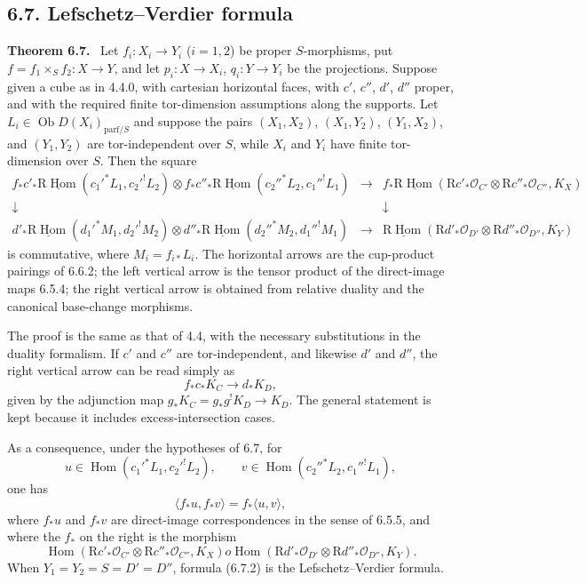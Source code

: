 \documentclass[12pt]{article}
\newcommand{\Hom}{\operatorname{Hom}}
\newcommand{\ob}{\operatorname{Ob}}
\newcommand{\R}{\mathrm R}
\newcommand{\cO}{\mathcal O}
\newenvironment{statement}[1]{\par\medskip\noindent\textbf{#1.}\ }{\par\medskip}
\begin{document}
\subsection*{6.7. Lefschetz--Verdier formula}
\begin{statement}{Theorem 6.7}
Let $f_i:X_i\to Y_i$ ($i=1,2$) be proper $S$-morphisms, put $f=f_1\times_S f_2:X\to Y$, and let $p_i:X\to X_i$, $q_i:Y\to Y_i$ be the projections. Suppose given a cube as in 4.4.0, with cartesian horizontal faces, with $c'$, $c''$, $d'$, $d''$ proper, and with the required finite tor-dimension assumptions along the supports. Let $L_i\in\ob D(X_i)_{\mathrm{parf}/S}$ and suppose the pairs $(X_1,X_2)$, $(X_1,Y_2)$, $(Y_1,X_2)$, and $(Y_1,Y_2)$ are tor-independent over $S$, while $X_i$ and $Y_i$ have finite tor-dimension over $S$. Then the square
\[
\begin{array}{ccc}
 f_*c'_*\underline{\R\Hom}(c_1'^*L_1,c_2'^!L_2)
 \otimes f_*c''_*\underline{\R\Hom}(c_2''^*L_2,c_1''^!L_1)
 &\to&
 f_*\underline{\R\Hom}(\R c'_*\cO_{C'}\otimes \R c''_*\cO_{C''},K_X)\\
 \downarrow && \downarrow\\
 d'_*\underline{\R\Hom}(d_1'^*M_1,d_2'^!M_2)
 \otimes d''_*\underline{\R\Hom}(d_2''^*M_2,d_1''^!M_1)
 &\to&
 \underline{\R\Hom}(\R d'_*\cO_{D'}\otimes \R d''_*\cO_{D''},K_Y)
\end{array}
\]
is commutative, where $M_i=f_{i*}L_i$. The horizontal arrows are the cup-product pairings of 6.6.2; the left vertical arrow is the tensor product of the direct-image maps 6.5.4; the right vertical arrow is obtained from relative duality and the canonical base-change morphisms.
\end{statement}

The proof is the same as that of 4.4, with the necessary substitutions in the duality formalism. If $c'$ and $c''$ are tor-independent, and likewise $d'$ and $d''$, the right vertical arrow can be read simply as
\[
   f_*c_*K_C\to d_*K_D,
\]
given by the adjunction map $g_*K_C=g_*g^!K_D\to K_D$. The general statement is kept because it includes excess-intersection cases.

As a consequence, under the hypotheses of 6.7, for
\[
   u\in\Hom(c_1'^*L_1,c_2'^!L_2),
   \qquad
   v\in\Hom(c_2''^*L_2,c_1''^!L_1),
\]
one has
\begin{equation}
   \langle f_*u,f_*v\rangle=f_*\langle u,v\rangle,
   \tag{6.7.2}
\end{equation}
where $f_*u$ and $f_*v$ are direct-image correspondences in the sense of 6.5.5, and where the $f_*$ on the right is the morphism
\begin{equation}
\Hom(\R c'_*\cO_{C'}\otimes \R c''_*\cO_{C''},K_X)	o
\Hom(\R d'_*\cO_{D'}\otimes \R d''_*\cO_{D''},K_Y).
\tag{6.7.3}
\end{equation}
When $Y_1=Y_2=S=D'=D''$, formula (6.7.2) is the Lefschetz--Verdier formula.
\end{document}
